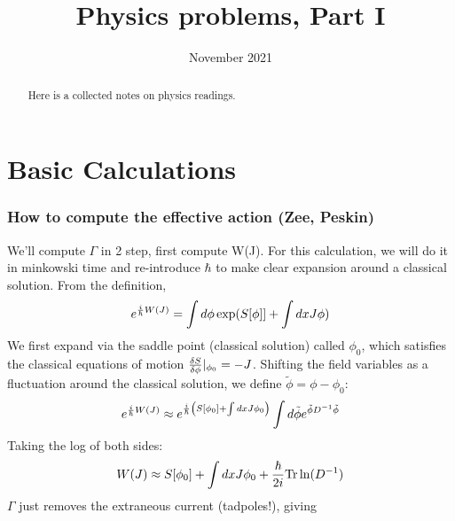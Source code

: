 \documentclass[9pt]{scrartcl}
\begin{document}
\title{Physics problems, Part I} %
\date{November 2021}
\maketitle

\begin{abstract}
	\sffamily\small
	Here is a collected notes on physics readings.
\end{abstract}

\vspace{1em}
\setlength{\belowdisplayskip}{0pt} \setlength{\belowdisplayshortskip}{1pt}
\setlength{\abovedisplayskip}{0pt} \setlength{\abovedisplayshortskip}{1pt}

\tableofcontents
\newpage



\section{Basic Calculations}
\subsubsection{How to compute the effective action (Zee, Peskin)}

We'll compute $\Gamma$ in 2 step, first compute W(J).  For this calculation, we will do it in minkowski time and re-introduce $\hbar$ to make clear expansion around a classical solution.
From the definition, 
\begin{align}
e^{{i \over \hbar}W(J) } =  \int d \phi \exp( S[\phi]] + \int dx J \phi) 
\end{align}
We first expand via the saddle point (classical solution) called $\phi_0$, which satisfies the classical equations of motion ${\delta S \over \delta \phi}|_{\phi_0} = -J$.  Shifting the field variables as a fluctuation around the classical solution, we define $\tilde{\phi} = \phi- \phi_0$:
\begin{align}
e^{{i \over \hbar} W(J)} \approx e^{{i \over \hbar} \left(S[\phi_0] + \int dx J \phi_0 \right)}   \int d \tilde{\phi} e^{\tilde{\phi} D^{-1} \tilde{\phi} } \\
\end{align}
Taking the log of both sides:
\begin{align}
W(J)  \approx S[\phi_0] + \int dx J \phi_0 + {\hbar \over 2 i} \text{Tr} \ln(D^{-1})
\end{align}
$\Gamma$ just removes the extraneous current (tadpoles!), giving
\end{document}
